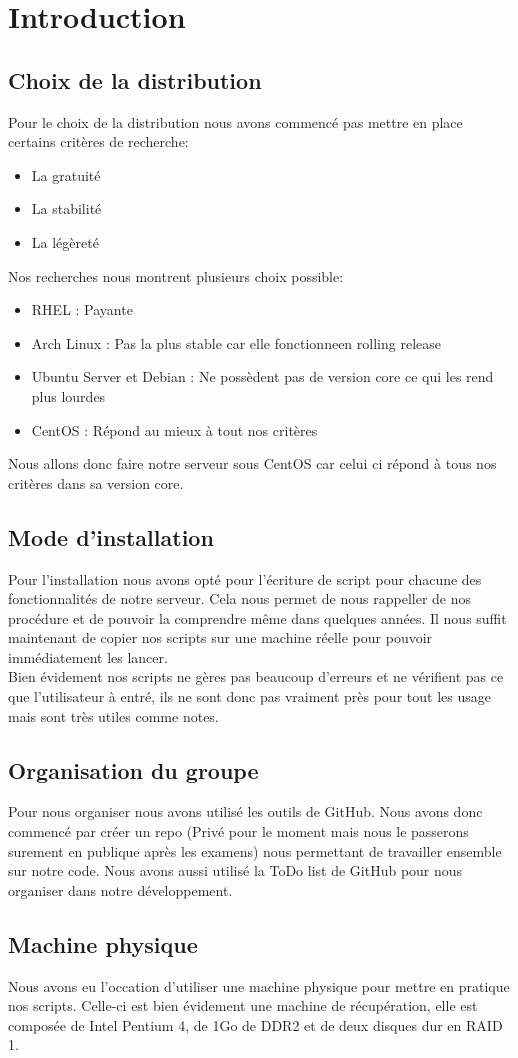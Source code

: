 \section{Introduction}
\subsection{Choix de la distribution}
Pour le choix de la distribution nous avons commencé pas mettre en place certains critères de recherche:
\begin{itemize}
	\item La gratuité
	\item La stabilité
	\item La légèreté
\end{itemize}
Nos recherches nous montrent plusieurs choix possible:
\begin{itemize}
	\item RHEL : Payante
	\item Arch Linux : Pas la plus stable car elle fonctionneen rolling release
	\item Ubuntu Server et Debian : Ne possèdent pas de version core ce qui les rend plus lourdes
	\item CentOS : Répond au mieux à tout nos critères
\end{itemize}
Nous allons donc faire notre serveur sous CentOS car celui ci répond à tous nos critères dans sa version core.

\subsection{Mode d'installation}
Pour l'installation nous avons opté pour l'écriture de script pour chacune des fonctionnalités de notre serveur. Cela nous permet de nous rappeller de nos procédure et de pouvoir la comprendre même dans quelques années.
Il nous suffit maintenant de copier nos scripts sur une machine réelle pour pouvoir immédiatement les lancer.\\
Bien évidement nos scripts ne gères pas beaucoup d'erreurs et ne vérifient pas ce que l'utilisateur à entré, ils ne sont donc pas vraiment près pour tout les usage mais sont très utiles comme notes.

\subsection{Organisation du groupe}
Pour nous organiser nous avons utilisé les outils de GitHub. Nous avons donc commencé par créer un repo (Privé pour le moment mais nous le passerons surement en publique après les examens) nous permettant de travailler ensemble sur notre code. Nous avons aussi utilisé la ToDo list de GitHub pour nous organiser dans notre développement.

\subsection{Machine physique}
Nous avons eu l'occation d'utiliser une machine physique pour mettre en pratique nos scripts. Celle-ci est bien évidement une machine de récupération, elle est composée de Intel Pentium 4, de 1Go de DDR2 et de deux disques dur en RAID 1.
